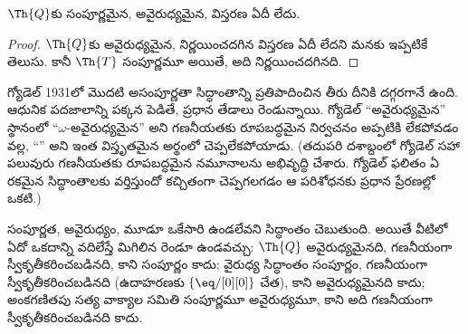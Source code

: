 \documentclass[../../../include/open-logic-section]{subfiles}
\begin{document}


\begin{thm}
$\Th{Q}$కు సంపూర్ణమైన, అవైరుధ్యమైన,  విస్తరణ ఏదీ లేదు.
\end{thm}

\begin{proof}
$\Th{Q}$కు అవైరుధ్యమైన, నిర్ణయించదగిన విస్తరణ ఏదీ లేదని మనకు ఇప్పటికే
తెలుసు. కానీ $\Th{T}$ సంపూర్ణమూ  అయితే, అది
నిర్ణయించదగినది.
\end{proof}

\begin{explain}
గ్యోడెల్ 1931లో మొదటి అసంపూర్ణతా సిద్ధాంతాన్ని ప్రతిపాదించిన తీరు దీనికి
దగ్గరగానే ఉంది. ఆధునిక పదజాలాన్ని పక్కన పెడితే, ప్రధాన తేడాలు రెండున్నాయి.
గ్యోడెల్ ``అవైరుధ్యమైన'' స్థానంలో ``$\omega$-అవైరుధ్యమైన'' అని
గణనీయతకు రూపబద్ధమైన నిర్వచనం అప్పటికి లేకపోవడం వల్ల,
``'' అని ఇంత విస్తృతమైన అర్థంలో చెప్పలేకపోయాడు. (తదుపరి
దశాబ్దంలో గ్యోడెల్ సహా పలువురు గణనీయతకు రూపబద్ధమైన నమూనాలను అభివృద్ధి చేశారు.
గ్యోడెల్ ఫలితం ఏ రకమైన సిద్ధాంతాలకు వర్తిస్తుందో కచ్చితంగా చెప్పగలగడం
ఆ పరిశోధనకు ప్రధాన ప్రేరణల్లో ఒకటి.)

సంపూర్ణత, అవైరుధ్యం,  మూడూ ఒకేసారి ఉండలేవని
సిద్ధాంతం చెబుతుంది. అయితే వీటిలో ఏదో ఒకదాన్ని వదిలేస్తే మిగిలిన రెండూ
ఉండవచ్చు: $\Th{Q}$ అవైరుధ్యమైనది, గణనీయంగా స్వీకృతీకరించబడినది, కాని
సంపూర్ణం కాదు; వైరుధ్య సిద్ధాంతం సంపూర్ణం, గణనీయంగా స్వీకృతీకరించబడినది
(ఉదాహరణకు $\{ \eq/[0][0] \}$ చేత), కాని అవైరుధ్యమైనది కాదు; అంకగణితపు
సత్య వాక్యాల సమితి సంపూర్ణమూ అవైరుధ్యమూ, కాని అది గణనీయంగా
స్వీకృతీకరించబడినది కాదు.
\end{explain}
\end{document}

